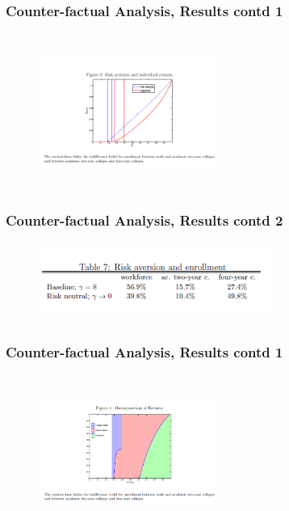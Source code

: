 \begin{frame}
	\frametitle{Counter-factual Analysis, Results contd 1}
		\begin{figure}[H] 
				\caption*{}
				\centering
				\includegraphics[width=2.3in, height=2in]{Figures/T/figure3.png}
		\end{figure}
\end{frame}

\begin{frame}
	\frametitle{Counter-factual Analysis, Results contd 2}
		\begin{figure}[H] 
				\caption*{}
				\centering
				\includegraphics[width=3in, height=1in]{Figures/T/table7.png}
		\end{figure}
\end{frame}

\begin{frame}
	\frametitle{Counter-factual Analysis, Results contd 1}
		\begin{figure}[H] 
				\caption*{}
				\centering
				\includegraphics[width=2.3in, height=2in]{Figures/T/figure4.png}
		\end{figure}
\end{frame}

